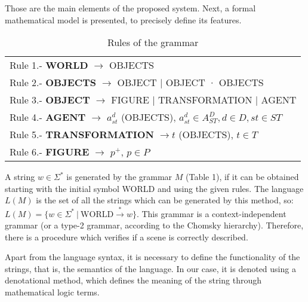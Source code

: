 \documentclass[runningheads]{llncs}
\begin{document}
Those are the main elements of the proposed system. Next, a formal mathematical model is presented,
to precisely define its features.


\begin{table}[h]
\begin{small}
\begin{center}
\begin{tabular}{|l|}

    \hline

    Rule 1.- \textbf{WORLD} $\rightarrow$ OBJECTS \\

    Rule 2.- \textbf{OBJECTS} $\rightarrow$ OBJECT $|$ OBJECT · OBJECTS \\

    Rule 3.- \textbf{OBJECT} $\rightarrow$ FIGURE $|$ TRANSFORMATION $|$ AGENT \\

    Rule 4.- \textbf{AGENT} $\rightarrow$ $a^d_{st}$ (OBJECTS), $a^d_{st} \in A^D_{ST}, d \in D, st \in ST$ \\

    Rule 5.- \textbf{TRANSFORMATION} $\rightarrow t$ (OBJECTS), $t \in T$ \\

    Rule 6.- \textbf{FIGURE} $\rightarrow$ $p^+$, $p \in P$ \\

    \hline

\end{tabular}
\end{center}
\end{small}
\label{tab:rules}
\caption{Rules of the grammar}
\end{table}


A string $w \in \Sigma^*$ is generated by the grammar $M$ (Table 1), if it can be
obtained starting with the initial symbol WORLD and using the given rules. The
language $L(M)$ is the set of all the strings
which can be generated by this method, so:
$L(M) = \lbrace w \in \Sigma^* \ | \ \text{WORLD} \stackrel{*}{\rightarrow} w \rbrace$.
This grammar is a context-independent grammar (or a type-2 grammar, according to the Chomsky
hierarchy). Therefore, there is a procedure which verifies if a scene is correctly described.

Apart from the language syntax, it is necessary to define the functionality of the strings, that is,
the semantics of the language. In our case, it is denoted using a denotational method, which defines
the meaning of the string through mathematical logic terms.
\end{document}
